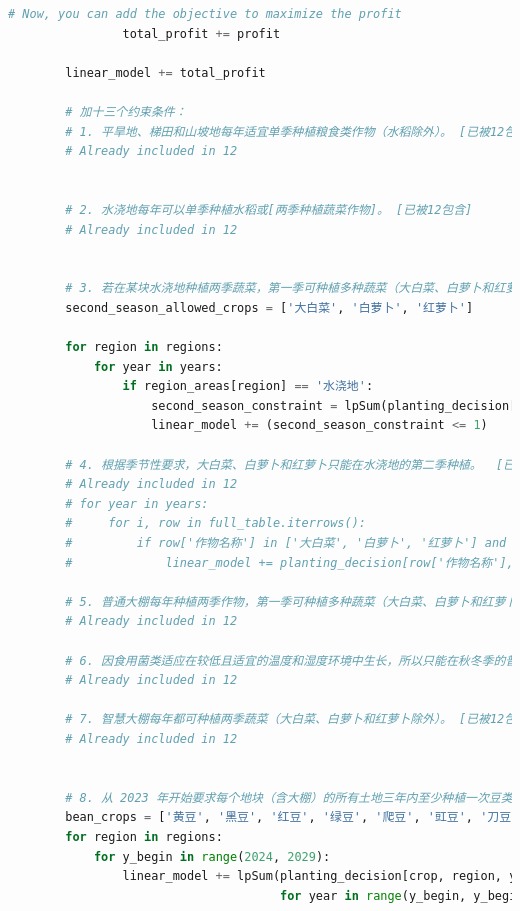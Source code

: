 \documentclass[withoutpreface]{cumcmthesis}
\begin{document}
\begin{appendices}
\begin{lstlisting}[language=python]
                # Now, you can add the objective to maximize the profit
                total_profit += profit
    
        linear_model += total_profit
    
        # 加十三个约束条件：
        # 1. 平旱地、梯田和山坡地每年适宜单季种植粮食类作物（水稻除外）。 [已被12包含]
        # Already included in 12
    
    
        # 2. 水浇地每年可以单季种植水稻或[两季种植蔬菜作物]。 [已被12包含]
        # Already included in 12
    
    
        # 3. 若在某块水浇地种植两季蔬菜，第一季可种植多种蔬菜（大白菜、白萝卜和红萝卜除外）；第二季只能种植大白菜、白萝卜和红萝卜中的一种（便于管理）。
        second_season_allowed_crops = ['大白菜', '白萝卜', '红萝卜']
    
        for region in regions:
            for year in years:
                if region_areas[region] == '水浇地':
                    second_season_constraint = lpSum(planting_decision[(crop, region, year, '第二季')] for crop in second_season_allowed_crops)
                    linear_model += (second_season_constraint <= 1)
    
        # 4. 根据季节性要求，大白菜、白萝卜和红萝卜只能在水浇地的第二季种植。  [已被12包含]
        # Already included in 12
        # for year in years:
        #     for i, row in full_table.iterrows():
        #         if row['作物名称'] in ['大白菜', '白萝卜', '红萝卜'] and row['地块类型'] == '水浇地':
        #             linear_model += planting_decision[row['作物名称'], row['种植地块'], year, '第一季'] == 0            
    
        # 5. 普通大棚每年种植两季作物，第一季可种植多种蔬菜（大白菜、白萝卜和红萝卜除外），第二季只能种植食用菌。[已被12包含]
        # Already included in 12
    
        # 6. 因食用菌类适应在较低且适宜的温度和湿度环境中生长，所以只能在秋冬季的普通大棚里种植。 [已被12包含]
        # Already included in 12
    
        # 7. 智慧大棚每年都可种植两季蔬菜（大白菜、白萝卜和红萝卜除外）。 [已被12包含]
        # Already included in 12
    
    
        # 8. 从 2023 年开始要求每个地块（含大棚）的所有土地三年内至少种植一次豆类作物。
        bean_crops = ['黄豆', '黑豆', '红豆', '绿豆', '爬豆', '豇豆', '刀豆', '芸豆']
        for region in regions:
            for y_begin in range(2024, 2029):
                linear_model += lpSum(planting_decision[crop, region, year, season] for crop in bean_crops 
                                      for year in range(y_begin, y_begin + 3) for season in seasons) >= 1
    

\end{lstlisting}
\end{appendices}
\end{document}
